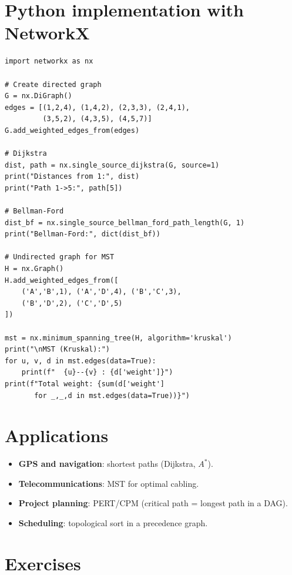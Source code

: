 \section{Python implementation with NetworkX}

\begin{codeblock}[title=\textbf{Shortest paths and MST}]
\begin{verbatim}
import networkx as nx

# Create directed graph
G = nx.DiGraph()
edges = [(1,2,4), (1,4,2), (2,3,3), (2,4,1),
         (3,5,2), (4,3,5), (4,5,7)]
G.add_weighted_edges_from(edges)

# Dijkstra
dist, path = nx.single_source_dijkstra(G, source=1)
print("Distances from 1:", dist)
print("Path 1->5:", path[5])

# Bellman-Ford
dist_bf = nx.single_source_bellman_ford_path_length(G, 1)
print("Bellman-Ford:", dict(dist_bf))

# Undirected graph for MST
H = nx.Graph()
H.add_weighted_edges_from([
    ('A','B',1), ('A','D',4), ('B','C',3),
    ('B','D',2), ('C','D',5)
])

mst = nx.minimum_spanning_tree(H, algorithm='kruskal')
print("\nMST (Kruskal):")
for u, v, d in mst.edges(data=True):
    print(f"  {u}--{v} : {d['weight']}")
print(f"Total weight: {sum(d['weight']
       for _,_,d in mst.edges(data=True))}")
\end{verbatim}
\end{codeblock}

\section{Applications}

\begin{itemize}
  \item \textbf{GPS and navigation}: shortest paths (Dijkstra, $A^*$).
  \item \textbf{Telecommunications}: MST for optimal cabling.
  \item \textbf{Project planning}: PERT/CPM (critical path = longest path in
        a DAG).
  \item \textbf{Scheduling}: topological sort in a precedence graph.
\end{itemize}

\section{Exercises}


